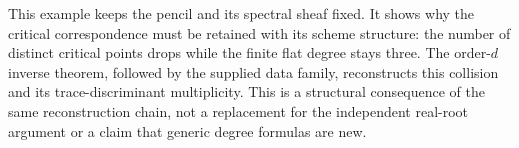 This example keeps the pencil and its spectral sheaf fixed.  It shows
why the critical correspondence must be retained with its scheme
structure: the number of distinct critical points drops while the
finite flat degree stays three.  The order-\(d\) inverse theorem,
followed by the supplied data family, reconstructs this collision and
its trace-discriminant multiplicity.  This is a structural consequence
of the same reconstruction chain, not a replacement for the independent
real-root argument or a claim that generic degree formulas are new.
